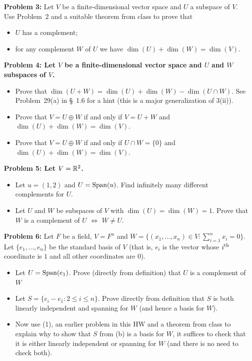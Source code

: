 \documentclass[11pt]{amsart}
\begin{document}
\skv
{\bf Problem 3: } Let $V$ be a finite-dimensional vector space and $U$ a subspace of $V$. Use Problem~2 and a suitable theorem from class
to prove that
\begin{itemize}
\item[(i)] $U$ has a complement;
\item[(ii)] for any complement $W$ of $U$ we have $\dim(U)+\dim(W)=\dim(V)$. 
\end{itemize}
\skv
\skv
\bf{Problem 4: }\rm Let $V$ be a finite-dimensional vector space and $U$ and $W$ subspaces of $V$.
\begin{itemize}
\item[(a)] Prove that $\dim(U+W)=\dim(U)+\dim(W)-\dim(U\cap W)$. See Problem~29(a) in \S~1.6 for
a hint (this is a major generalization of 3(ii)).
\item[(b)] Prove that $V=U\oplus W$ if and only if $V=U+W$ and $\dim(U)+\dim(W)=\dim(V)$.
\item[(c)] Prove that $V=U\oplus W$ if and only if $U\cap W=\{0\}$ and $\dim(U)+\dim(W)=\dim(V)$.
\end{itemize}
\skv
\bf{Problem 5: }\rm Let $V={\mathbb R}^2$.
\begin{itemize}
\item[(a)] Let $u=(1,2)$ and $U={\rm Span}(u)$. Find infinitely many different complements for $U$.
\item[(b)] Let $U$ and $W$ be subspaces of $V$ with $\dim(U)=\dim(W)=1$. Prove that $W$ is a complement
of $U$ $\iff$ $W\neq U$.
\end{itemize}
\skv
{\bf Problem 6: } Let $F$ be a field, $V=F^n$ and $W=\{(x_1,\ldots, x_n)\in V: \sum\limits_{i=1}^n x_i=0\}$. Let $\{e_1,\ldots, e_n\}$
be the standard basis of $V$ (that is, $e_i$ is the vector whose $i^{\rm th}$ coordinate is $1$ and all other coordinates are $0$).
\begin{itemize}
\item[(1)] Let $U={\rm Span}(e_1)$. Prove (directly from definition) that $U$ is a complement of $W$
\item[(2)] Let $S=\{e_i-e_1: 2\leq i\leq n\}$. Prove directly from definition that $S$ is both linearly independent and spanning for $W$
(and hence a basis for $W$). 
\item[(3)] Now use (1), an earlier problem in this HW and a theorem from class to explain why to show that $S$ from (b) is a basis
for $W$, it suffices to check that it is either linearly independent or spanning for $W$ (and there is no need to check both).
\end{itemize}
\end{document}
